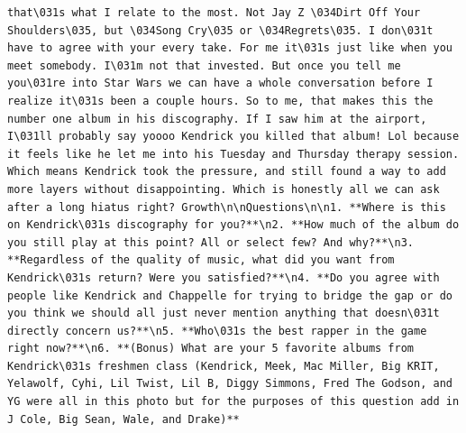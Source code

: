 \documentclass[
  letterpaper,
  DIV=11,
  numbers=noendperiod]{scrreprt}
\begin{document}
\begin{verbatim}
that\031s what I relate to the most. Not Jay Z \034Dirt Off Your Shoulders\035, but \034Song Cry\035 or \034Regrets\035. I don\031t have to agree with your every take. For me it\031s just like when you meet somebody. I\031m not that invested. But once you tell me you\031re into Star Wars we can have a whole conversation before I realize it\031s been a couple hours. So to me, that makes this the number one album in his discography. If I saw him at the airport, I\031ll probably say yoooo Kendrick you killed that album! Lol because it feels like he let me into his Tuesday and Thursday therapy session. Which means Kendrick took the pressure, and still found a way to add more layers without disappointing. Which is honestly all we can ask after a long hiatus right? Growth\n\nQuestions\n\n1. **Where is this on Kendrick\031s discography for you?**\n2. **How much of the album do you still play at this point? All or select few? And why?**\n3. **Regardless of the quality of music, what did you want from Kendrick\031s return? Were you satisfied?**\n4. **Do you agree with people like Kendrick and Chappelle for trying to bridge the gap or do you think we should all just never mention anything that doesn\031t directly concern us?**\n5. **Who\031s the best rapper in the game right now?**\n6. **(Bonus) What are your 5 favorite albums from Kendrick\031s freshmen class (Kendrick, Meek, Mac Miller, Big KRIT, Yelawolf, Cyhi, Lil Twist, Lil B, Diggy Simmons, Fred The Godson, and YG were all in this photo but for the purposes of this question add in J Cole, Big Sean, Wale, and Drake)**

\end{verbatim}
\end{document}

